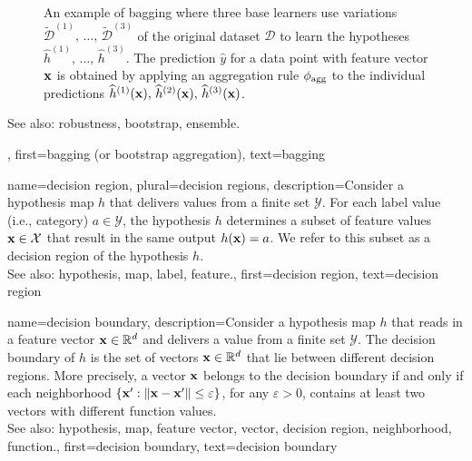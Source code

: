 {{{\begin{figure}[htbp]
\begin{center}
		\caption{An example of bagging where three base learners use variations 
		$\widetilde{\mathcal{D}}^{(1)},\,\ldots,\,\widetilde{\mathcal{D}}^{(3)}$ of 
		the original dataset $\mathcal{D}$ to learn the hypotheses 
		$\widehat{h}^{(1)},\,\ldots,\,\widehat{h}^{(3)}$. 
		The prediction $\hat{y}$ for a data point with feature vector ${\bf x}$ 
		is obtained by applying an aggregation rule $\phi_{\rm agg}$ to the individual predictions 
		$\widehat{h}^{(1)}({\bf x}),\,\widehat{h}^{(2)}({\bf x}),\,\widehat{h}^{(3)}({\bf x})$.}
		\end{center}
		\end{figure}
		See also: robustness, bootstrap, ensemble.},
	first={bagging (or bootstrap aggregation)},
	text={bagging}
}

{name={decision region}, plural={decision regions}, 
	description={Consider 
		a hypothesis map $h$ that delivers values from a finite set $\mathcal{Y}$. 
		For each label value (i.e., category) $a \in \mathcal{Y}$, the hypothesis $h$ 
		determines a subset of feature values ${\bf x} \in \mathcal{X}$ that result 
		in the same output $h({\bf x})=a$. We refer to this subset as a decision 
		region of the hypothesis $h$.
				\\
		See also: hypothesis, map, label, feature.},
	first={decision region},
	text={decision region} 
}


{name={decision boundary}, 
	description={Consider a 
		hypothesis map $h$ that reads in a feature vector  
		${\bf x} \in \mathbb{R}^{d}$ and delivers a value from a finite set $\mathcal{Y}$. 
		The decision boundary of $h$ is the set of vectors ${\bf x} \in \mathbb{R}^{d}$ 
		that lie between different decision regions. More precisely, a 
		vector ${\bf x}$ belongs to the decision boundary if and only 
		if each neighborhood $\{ {\bf x}': \| {\bf x} - {\bf x}' \| \leq \varepsilon \}$, 
		for any $\varepsilon >0$, contains at least two vectors with different function values.
				\\
		See also: hypothesis, map, feature vector, vector, decision region, neighborhood, function.},
	first={decision boundary},
	text={decision boundary} 
}


}
